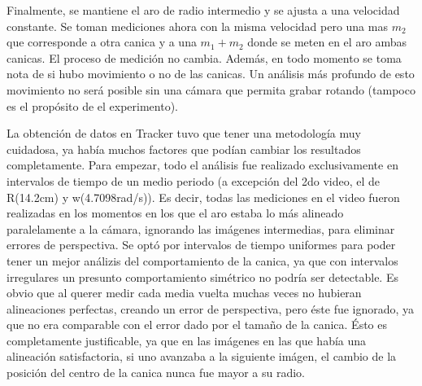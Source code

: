 \documentclass[12p]{article}
\begin{document}
\par Finalmente, se mantiene el aro de radio intermedio y se ajusta a una velocidad constante. Se toman mediciones ahora con la misma velocidad pero una mas $m_2$ que corresponde a otra canica y a una $m_1 +m_2$ donde se meten en el aro ambas canicas. El proceso de medición no cambia. Además, en todo momento se toma nota de si hubo movimiento o no de las canicas. Un análisis más profundo de esto movimiento no será posible sin una cámara que permita grabar rotando (tampoco es el propósito de el experimento).

La obtención de datos en Tracker tuvo que tener una metodología muy cuidadosa, ya había muchos factores que podían cambiar los resultados completamente. Para empezar, todo el análisis fue realizado exclusivamente en intervalos de tiempo de un medio periodo (a excepción del 2do video, el de R(14.2cm) y w(4.7098rad/s)). Es decir, todas las mediciones en el video fueron realizadas en los momentos en los que el aro estaba lo más alineado paralelamente a la cámara, ignorando las imágenes intermedias, para eliminar errores de perspectiva. Se optó por intervalos de tiempo uniformes para poder tener un mejor análizis del comportamiento de la canica, ya que con intervalos irregulares un presunto comportamiento simétrico no podría ser detectable. Es obvio que al querer medir cada media vuelta muchas veces no hubieran alineaciones perfectas, creando un error de perspectiva, pero éste fue ignorado, ya que no era comparable con el error dado por el tamaño de la canica. Ésto es completamente justificable, ya que en las imágenes en las que había una alineación satisfactoria, si uno avanzaba a la siguiente imágen, el cambio de la posición del centro de la canica nunca fue mayor a su radio.
\end{document}
